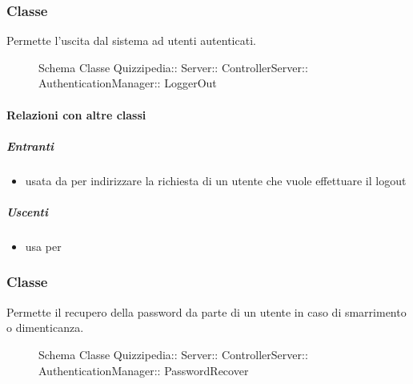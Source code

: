 \subsubsection{Classe }
Permette l'uscita dal sistema ad utenti autenticati.
\begin{figure}[H]
\centering
\noindent{}
\caption[Schema Classe LoggerOut]{Schema Classe Quizzipedia:: Server:: ControllerServer:: AuthenticationManager:: LoggerOut}
\end{figure}
\paragraph{Relazioni con altre classi}
\subparagraph{Entranti}
\begin{itemize}
\item usata da  per indirizzare la richiesta di un utente che vuole effettuare il logout
\end{itemize}
\subparagraph{Uscenti}
\begin{itemize}
\item usa  per 
\end{itemize}
\subsubsection{Classe }
Permette il recupero della password da parte di un utente in caso di smarrimento o dimenticanza.
\begin{figure}[H]
\centering
\noindent{}
\caption[Schema Classe PasswordRecover]{Schema Classe Quizzipedia:: Server:: ControllerServer:: AuthenticationManager:: PasswordRecover}
\end{figure}
